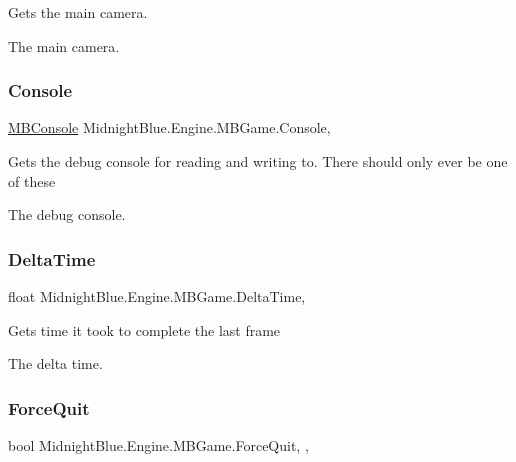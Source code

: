 Gets the main camera. 

The main camera.\hypertarget{class_midnight_blue_1_1_engine_1_1_m_b_game_ad258df9f554e120fee5db56513248845}{}\label{class_midnight_blue_1_1_engine_1_1_m_b_game_ad258df9f554e120fee5db56513248845} 
\subsubsection{\texorpdfstring{Console}{Console}}
{\footnotesize\ttfamily \hyperlink{class_midnight_blue_1_1_engine_1_1_m_b_console}{M\+B\+Console} Midnight\+Blue.\+Engine.\+M\+B\+Game.\+Console\hspace{0.3cm}{\ttfamily [static]}, {\ttfamily [get]}}



Gets the debug console for reading and writing to. There should only ever be one of these 

The debug console.\hypertarget{class_midnight_blue_1_1_engine_1_1_m_b_game_a8d74b0cdb60f27e8a1934854f540a7bc}{}\label{class_midnight_blue_1_1_engine_1_1_m_b_game_a8d74b0cdb60f27e8a1934854f540a7bc} 
\subsubsection{\texorpdfstring{Delta\+Time}{DeltaTime}}
{\footnotesize\ttfamily float Midnight\+Blue.\+Engine.\+M\+B\+Game.\+Delta\+Time\hspace{0.3cm}{\ttfamily [static]}, {\ttfamily [get]}}



Gets time it took to complete the last frame 

The delta time.\hypertarget{class_midnight_blue_1_1_engine_1_1_m_b_game_a444312fc226de72869013fa8d055add1}{}\label{class_midnight_blue_1_1_engine_1_1_m_b_game_a444312fc226de72869013fa8d055add1} 
\subsubsection{\texorpdfstring{Force\+Quit}{ForceQuit}}
{\footnotesize\ttfamily bool Midnight\+Blue.\+Engine.\+M\+B\+Game.\+Force\+Quit\hspace{0.3cm}{\ttfamily [static]}, {\ttfamily [get]}, {\ttfamily [set]}}



